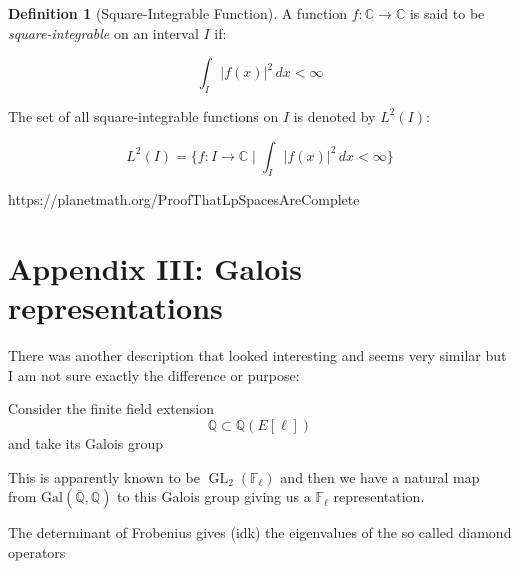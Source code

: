 \documentclass{article}
\theoremstyle{definition}
\newtheorem{definition}{Definition}[section]
\theoremstyle{definition}
\theoremstyle{definition}
\newcommand{\gl}{\operatorname{GL}}
\newcommand{\galq}{\operatorname{Gal(\overline{\Q},\Q)}}
\newcommand{\Q}{\mathbb{Q}}
\newcommand{\F}{\mathbb{F}}
\begin{document}
\begin{definition} [Square-Integrable Function]
 A function \( f: \mathbb{C} \to \mathbb{C} \) is said to be \textit{square-integrable} on an interval \( I \) if:

\[
\int_I |f(x)|^2 \, dx < \infty
\]

The set of all square-integrable functions on \( I \) is denoted by \( L^2(I) \):

\[
L^2(I) = \{ f : I \to \mathbb{C} \mid \int_I |f(x)|^2 \, dx < \infty \}
\]

https://planetmath.org/ProofThatLpSpacesAreComplete
\end{definition}


\section{Appendix III: Galois representations}


There was another description that looked interesting and seems very similar but I am not sure exactly the difference or purpose:


Consider the finite field extension
$$\Q\subset \Q(E[\ell])$$
and take its Galois group 


This is apparently known to be $\gl_2(\F_\ell)$ and then we have a natural map from $\galq$ to this Galois group giving us a $\F_\ell$ representation.



The determinant of Frobenius gives (idk) the eigenvalues of the so called diamond operators








\end{document}
